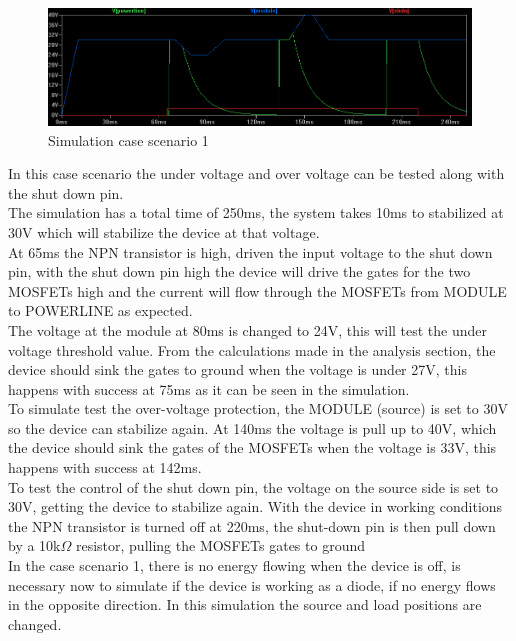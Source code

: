 \begin{figure}[H]
	\begin{centering}
		\includegraphics[width=1\textwidth]{images/tb5_LTC_case1.png}
		\caption{Simulation case scenario 1}
	\end{centering}
\end{figure}
In this case scenario the under voltage and over voltage can be tested along with the shut down pin.\\
The simulation has a total time of 250ms, the system takes 10ms to stabilized at 30V which will stabilize the device at that voltage.\\ 
At 65ms the NPN transistor is high, driven the input voltage to the shut down pin, with the shut down pin high the device will drive the gates for the two MOSFETs high and the current will flow through the MOSFETs from MODULE to POWERLINE as expected.\\
The voltage at the module at 80ms is changed to 24V, this will test the under voltage threshold value. From the calculations made in the analysis section, the device should sink the gates to ground when the voltage is under 27V, this happens with success at 75ms as it can be seen in the simulation.\\
To simulate test the over-voltage protection, the MODULE (source) is set to 30V so the device can stabilize again. At 140ms the voltage is pull up to 40V, which the device should sink the gates of the MOSFETs when the voltage is 33V, this happens with success at 142ms.\\
To test the control of the shut down pin, the voltage on the source side is set to 30V, getting the device to stabilize again. With the device in working conditions the NPN transistor is turned off at 220ms, the shut-down pin is then pull down by a 10k$ \Omega $ resistor, pulling the MOSFETs gates to ground\\ 
%
In the case scenario 1, there is no energy flowing when the device is off, is necessary now to simulate if the device is working as a diode, if no energy flows in the opposite direction. In this simulation the source and load positions are changed.
